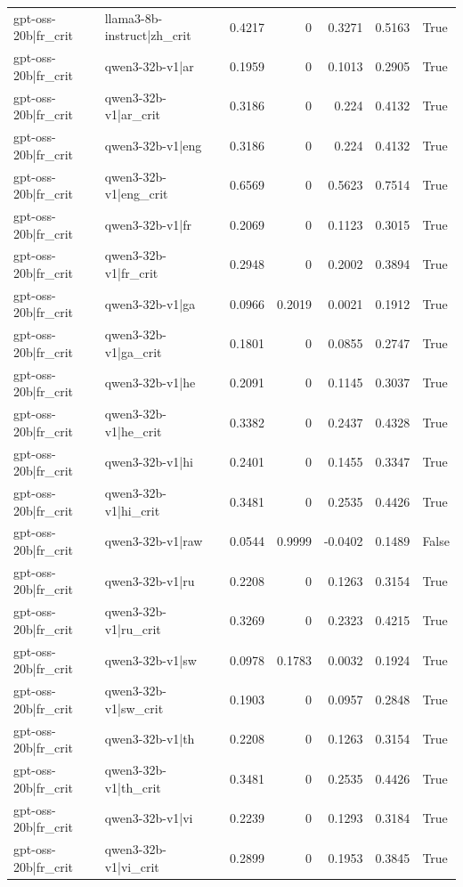 \begin{table}
\begin{tabular}{l l r r r r l}
gpt-oss-20b|fr_crit & llama3-8b-instruct|zh_crit & 0.4217 & 0 & 0.3271 & 0.5163 & True \\
gpt-oss-20b|fr_crit & qwen3-32b-v1|ar & 0.1959 & 0 & 0.1013 & 0.2905 & True \\
gpt-oss-20b|fr_crit & qwen3-32b-v1|ar_crit & 0.3186 & 0 & 0.224 & 0.4132 & True \\
gpt-oss-20b|fr_crit & qwen3-32b-v1|eng & 0.3186 & 0 & 0.224 & 0.4132 & True \\
gpt-oss-20b|fr_crit & qwen3-32b-v1|eng_crit & 0.6569 & 0 & 0.5623 & 0.7514 & True \\
gpt-oss-20b|fr_crit & qwen3-32b-v1|fr & 0.2069 & 0 & 0.1123 & 0.3015 & True \\
gpt-oss-20b|fr_crit & qwen3-32b-v1|fr_crit & 0.2948 & 0 & 0.2002 & 0.3894 & True \\
gpt-oss-20b|fr_crit & qwen3-32b-v1|ga & 0.0966 & 0.2019 & 0.0021 & 0.1912 & True \\
gpt-oss-20b|fr_crit & qwen3-32b-v1|ga_crit & 0.1801 & 0 & 0.0855 & 0.2747 & True \\
gpt-oss-20b|fr_crit & qwen3-32b-v1|he & 0.2091 & 0 & 0.1145 & 0.3037 & True \\
gpt-oss-20b|fr_crit & qwen3-32b-v1|he_crit & 0.3382 & 0 & 0.2437 & 0.4328 & True \\
gpt-oss-20b|fr_crit & qwen3-32b-v1|hi & 0.2401 & 0 & 0.1455 & 0.3347 & True \\
gpt-oss-20b|fr_crit & qwen3-32b-v1|hi_crit & 0.3481 & 0 & 0.2535 & 0.4426 & True \\
gpt-oss-20b|fr_crit & qwen3-32b-v1|raw & 0.0544 & 0.9999 & -0.0402 & 0.1489 & False \\
gpt-oss-20b|fr_crit & qwen3-32b-v1|ru & 0.2208 & 0 & 0.1263 & 0.3154 & True \\
gpt-oss-20b|fr_crit & qwen3-32b-v1|ru_crit & 0.3269 & 0 & 0.2323 & 0.4215 & True \\
gpt-oss-20b|fr_crit & qwen3-32b-v1|sw & 0.0978 & 0.1783 & 0.0032 & 0.1924 & True \\
gpt-oss-20b|fr_crit & qwen3-32b-v1|sw_crit & 0.1903 & 0 & 0.0957 & 0.2848 & True \\
gpt-oss-20b|fr_crit & qwen3-32b-v1|th & 0.2208 & 0 & 0.1263 & 0.3154 & True \\
gpt-oss-20b|fr_crit & qwen3-32b-v1|th_crit & 0.3481 & 0 & 0.2535 & 0.4426 & True \\
gpt-oss-20b|fr_crit & qwen3-32b-v1|vi & 0.2239 & 0 & 0.1293 & 0.3184 & True \\
gpt-oss-20b|fr_crit & qwen3-32b-v1|vi_crit & 0.2899 & 0 & 0.1953 & 0.3845 & True \\

\end{tabular}
\end{table}

